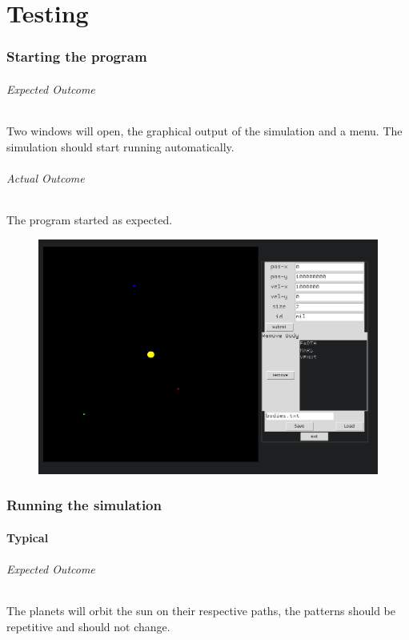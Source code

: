 \part{Testing}
\section{Starting the program}
\paragraph{Expected Outcome} 
Two windows will open, the graphical output of the simulation and a menu. The
simulation should start running automatically. 
\paragraph{Actual Outcome} 
The program started as expected.
\begin{figure}[h!]
	\includegraphics[width=\textwidth]{./img/start.png}
\end{figure}

\section{Running the simulation}
\subsection{Typical}
\paragraph{Expected Outcome}
The planets will orbit the sun on their respective paths, the patterns should be
repetitive and should not change.
